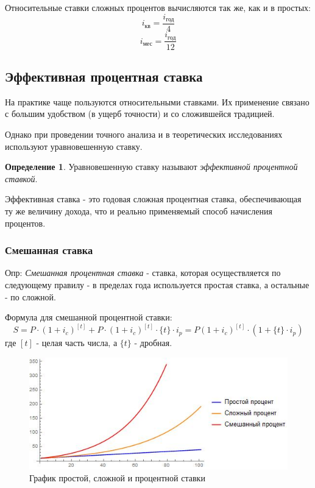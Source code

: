 \documentclass[aps,%
12pt,%
final,%
oneside,
onecolumn,%
musixtex, %
superscriptaddress,%
centertags]{article} %
\theoremstyle{plain}
\theoremstyle{definition}
\newtheorem{definition}{Определение}[subsection]
\theoremstyle{remark}
\begin{document}
Относительные ставки сложных процентов вычисляются так же, как и в простых:
$$i_{\text{кв}} = \frac{i_{\text{год}}}{4}$$
$$i_{\text{мес}} = \frac{i_{\text{год}}}{12}$$


\subsection{Эффективная процентная ставка}

На практике чаще пользуются относительными ставками. Их применение связано с большим удобством (в ущерб точности) и со сложившейся традицией.

Однако при проведении точного анализа и в теоретических исследованиях используют уравновешенную ставку.

\begin{definition}
	Уравновешенную ставку называют \textit{эффективной процентной ставкой}.

	Эффективная ставка - это годовая сложная процентная ставка, обеспечивающая ту же величину дохода, что и реально применяемый способ начисления процентов.
\end{definition}

\subsubsection{Смешанная ставка}

Опр: \textit{Смешанная процентная ставка} - ставка, которая осуществляется по следующему правилу - в пределах года используется простая ставка, а остальные - по сложной.

Формула для смешанной процентной ставки:
$$S = P\cdot (1+i_c)^{[t]} + P\cdot (1+i_c)^{[t]} \cdot {\{t\}}\cdot i_p = P(1+i_c)^{[t]} \cdot (1 + {\{t\}}\cdot i_p ) $$
где ${[t]}$ - целая часть числа, а  ${\{t\}}$ - дробная.
\begin{figure}[h!]
	
	\begin{center}
	\includegraphics[scale=0.6]{images/first.jpg}
	\caption{График простой, сложной и процентной ставки}
	\end{center}
\end{figure}
\end{document}
